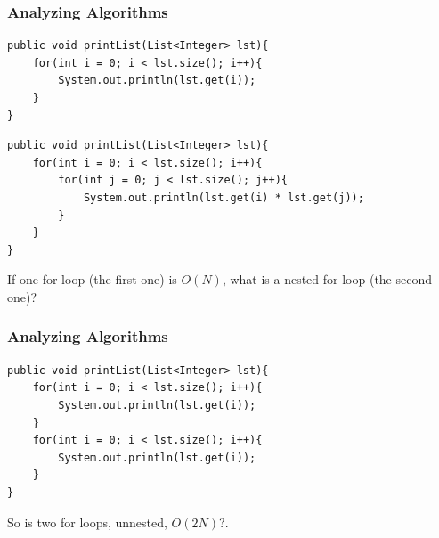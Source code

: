 \documentclass{beamer}
\begin{document}
\begin{frame}[fragile]
    \frametitle{Analyzing Algorithms}
    \centering
    \begin{minipage}{0.7\textwidth}
    \centering
    \begin{lstlisting}[frame=trBL, basicstyle=\tiny]
public void printList(List<Integer> lst){
    for(int i = 0; i < lst.size(); i++){
        System.out.println(lst.get(i));
    }
}
    \end{lstlisting}
    \begin{lstlisting}[frame=trBL, basicstyle=\tiny]
public void printList(List<Integer> lst){
    for(int i = 0; i < lst.size(); i++){
        for(int j = 0; j < lst.size(); j++){
            System.out.println(lst.get(i) * lst.get(j));
        }
    }
}
    \end{lstlisting}
    \end{minipage}
    \hfill
    \begin{minipage}{0.29\textwidth}
    \hfill
    \end{minipage}
    \vfill
    {\large If one for loop (the first one) is $O(N)$, what is a nested for loop (the second one)?}
    \vfill
\end{frame}

\begin{frame}[fragile]
    \frametitle{Analyzing Algorithms}
    \centering
    \begin{minipage}{0.7\textwidth}
    \centering
    \begin{lstlisting}[frame=trBL, basicstyle=\tiny]
public void printList(List<Integer> lst){
    for(int i = 0; i < lst.size(); i++){
        System.out.println(lst.get(i));
    }
    for(int i = 0; i < lst.size(); i++){
        System.out.println(lst.get(i));
    }
}
    \end{lstlisting}
    \end{minipage}
    \hfill
    \begin{minipage}{0.29\textwidth}
    \hfill
    \end{minipage}
    \vfill
    {\large So is two for loops, unnested, $O(2N)$?}. 
    \vfill
\end{frame}
\end{document}
